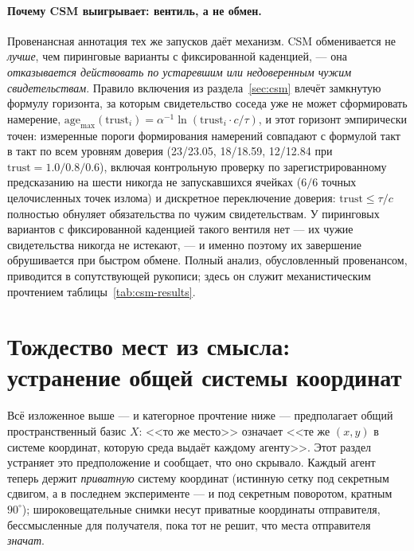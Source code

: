 \documentclass{article}
\begin{document}
\paragraph{Почему CSM выигрывает: вентиль, а не обмен.} Провенансная
аннотация тех же запусков даёт механизм. CSM обменивается не
\emph{лучше}, чем пиринговые варианты с фиксированной каденцией, ---
она \emph{отказывается действовать по устаревшим или недоверенным
чужим свидетельствам}. Правило включения из раздела~\ref{sec:csm}
влечёт замкнутую формулу горизонта, за которым свидетельство соседа
уже не может сформировать намерение,
$\mathrm{age}_{\max}(\mathrm{trust}_i) = \alpha^{-1}
\ln(\mathrm{trust}_i \cdot c/\tau)$, и этот горизонт эмпирически
точен: измеренные пороги формирования намерений совпадают с формулой
такт в такт по всем уровням доверия (23/23.05, 18/18.59, 12/12.84 при
$\mathrm{trust}=1.0/0.8/0.6$), включая контрольную проверку по
зарегистрированному предсказанию на шести никогда не запускавшихся
ячейках ($6/6$ точных целочисленных точек излома) и дискретное
переключение доверия: $\mathrm{trust}\le\tau/c$ полностью обнуляет
обязательства по чужим свидетельствам. У пиринговых вариантов с
фиксированной каденцией такого вентиля нет --- их чужие свидетельства
никогда не истекают, --- и именно поэтому их завершение обрушивается
при быстром обмене. Полный анализ, обусловленный провенансом,
приводится в сопутствующей рукописи; здесь он служит механистическим
прочтением таблицы~\ref{tab:csm-results}.

\section{Тождество мест из смысла: устранение общей системы координат}
\label{sec:semantic-identity}

Всё изложенное выше --- и категорное прочтение ниже --- предполагает
общий пространственный базис $X$: <<то же место>> означает <<те же
$(x,y)$ в системе координат, которую среда выдаёт каждому агенту>>.
Этот раздел устраняет это предположение и сообщает, что оно скрывало.
Каждый агент теперь держит \emph{приватную} систему координат
(истинную сетку под секретным сдвигом, а в последнем эксперименте ---
и под секретным поворотом, кратным $90^\circ$); широковещательные
снимки несут приватные координаты отправителя, бессмысленные для
получателя, пока тот не решит, что места отправителя \emph{значат}.
\end{document}
